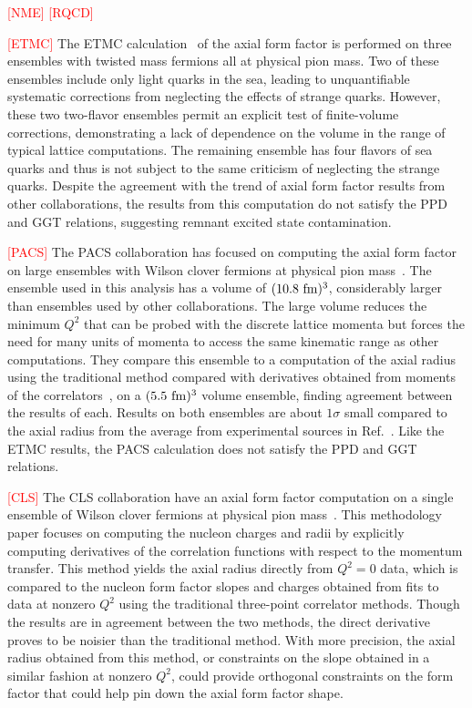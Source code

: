 \textcolor{red}{[NME]}
\textcolor{red}{[RQCD]}

\textcolor{red}{[ETMC]}
The ETMC calculation~\cite{Alexandrou:2020okk} of the axial form factor
 is performed on three ensembles with twisted mass fermions all at physical pion mass.
Two of these ensembles include only light quarks in the sea,
 leading to unquantifiable systematic corrections from
 neglecting the effects of strange quarks.
However, these two two-flavor ensembles permit an explicit test of finite-volume corrections,
 demonstrating a lack of dependence on the volume in the range of typical lattice computations.
The remaining ensemble has four flavors of sea quarks and thus is not subject
 to the same criticism of neglecting the strange quarks.
Despite the agreement with the trend of axial form factor results from other collaborations,
 the results from this computation do not satisfy the PPD and GGT relations,
 suggesting remnant excited state contamination.

\textcolor{red}{[PACS]}
The PACS collaboration has focused on computing the axial form factor
 on large ensembles with Wilson clover fermions at
 physical pion mass~\cite{Ishikawa:2018rew,Shintani:2018ozy}.
The ensemble used in this analysis has a volume of $(10.8~{\rm fm})^3$,
 considerably larger than ensembles used by other collaborations.
The large volume reduces the minimum $Q^2$ that can be probed
 with the discrete lattice momenta but forces the need for many units of momenta
 to access the same kinematic range as other computations.
They compare this ensemble to a computation of the axial radius using
 the traditional method compared with derivatives obtained from
 moments of the correlators~\cite{Aglietti:1994nx},
 on a $(5.5~{\rm fm})^3$ volume ensemble, finding agreement between the results of each.
Results on both ensembles are about $1\sigma$ small compared to the axial radius
 from the average from experimental sources in Ref.~\cite{Hill:2017wgb}.
Like the ETMC results, the PACS calculation does not satisfy the PPD and GGT relations.

\textcolor{red}{[CLS]}
The CLS collaboration have an axial form factor computation on a
 single ensemble of Wilson clover fermions at physical pion mass~\cite{Hasan:2017wwt}.
This methodology paper focuses on computing the nucleon charges
 and radii by explicitly computing derivatives of the correlation functions
 with respect to the momentum transfer.
This method yields the axial radius directly from $Q^2=0$ data,
 which is compared to the nucleon form factor slopes and charges obtained from
 fits to data at nonzero $Q^2$ using the traditional three-point correlator methods.
Though the results are in agreement between the two methods,
 the direct derivative proves to be noisier than the traditional method.
With more precision, the axial radius obtained from this method,
 or constraints on the slope obtained in a similar fashion at nonzero $Q^2$,
 could provide orthogonal constraints on the form factor that could
 help pin down the axial form factor shape.

